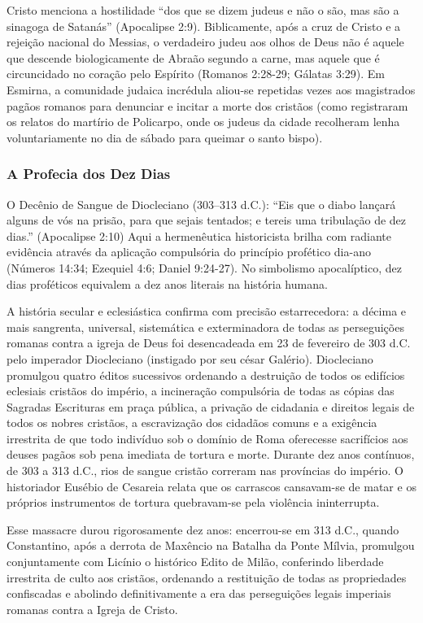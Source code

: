 \documentclass[11pt,a4paper,openany]{book}
\begin{document}
Cristo menciona a hostilidade ``dos que se dizem judeus e não o são, mas são a sinagoga de Satanás'' (Apocalipse 2:9). Biblicamente, após a cruz de Cristo e a rejeição nacional do Messias, o verdadeiro judeu aos olhos de Deus não é aquele que descende biologicamente de Abraão segundo a carne, mas aquele que é circuncidado no coração pelo Espírito (Romanos 2:28-29; Gálatas 3:29). Em Esmirna, a comunidade judaica incrédula aliou-se repetidas vezes aos magistrados pagãos romanos para denunciar e incitar a morte dos cristãos (como registraram os relatos do martírio de Policarpo, onde os judeus da cidade recolheram lenha voluntariamente no dia de sábado para queimar o santo bispo).


\subsubsection*{A Profecia dos Dez Dias}
O Decênio de Sangue de Diocleciano (303–313 d.C.):
``Eis que o diabo lançará alguns de vós na prisão, para que sejais tentados; e tereis uma tribulação de dez dias.'' (Apocalipse 2:10)
Aqui a hermenêutica historicista brilha com radiante evidência através da aplicação compulsória do princípio profético dia-ano (Números 14:34; Ezequiel 4:6; Daniel 9:24-27). No simbolismo apocalíptico, dez dias proféticos equivalem a dez anos literais na história humana.

A história secular e eclesiástica confirma com precisão estarrecedora: a décima e mais sangrenta, universal, sistemática e exterminadora de todas as perseguições romanas contra a igreja de Deus foi desencadeada em 23 de fevereiro de 303 d.C. pelo imperador Diocleciano (instigado por seu césar Galério). Diocleciano promulgou quatro éditos sucessivos ordenando a destruição de todos os edifícios eclesiais cristãos do império, a incineração compulsória de todas as cópias das Sagradas Escrituras em praça pública, a privação de cidadania e direitos legais de todos os nobres cristãos, a escravização dos cidadãos comuns e a exigência irrestrita de que todo indivíduo sob o domínio de Roma oferecesse sacrifícios aos deuses pagãos sob pena imediata de tortura e morte. Durante dez anos contínuos, de 303 a 313 d.C., rios de sangue cristão correram nas províncias do império. O historiador Eusébio de Cesareia relata que os carrascos cansavam-se de matar e os próprios instrumentos de tortura quebravam-se pela violência ininterrupta.

Esse massacre durou rigorosamente dez anos: encerrou-se em 313 d.C., quando Constantino, após a derrota de Maxêncio na Batalha da Ponte Mílvia, promulgou conjuntamente com Licínio o histórico Edito de Milão, conferindo liberdade irrestrita de culto aos cristãos, ordenando a restituição de todas as propriedades confiscadas e abolindo definitivamente a era das perseguições legais imperiais romanas contra a Igreja de Cristo.
\end{document}
